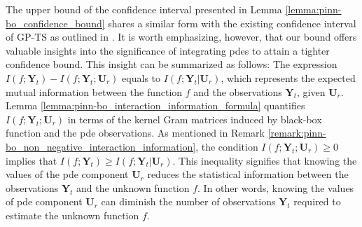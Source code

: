 \begin{remark}
    The upper bound of the confidence interval presented in Lemma \ref{lemma:pinn-bo_confidence_bound} shares a similar form with the existing confidence interval of GP-TS as outlined in \citet{chowdhury2017kernelized}. It is worth emphasizing, however, that our bound offers valuable insights into the significance of integrating \acp{pde} to attain a tighter confidence bound. This insight can be summarized as follows: The expression $I(f; \mathbf{Y}_t) - I(f; \mathbf{Y}_t; \mathbf{U}_r)$ equals to $I(f; \mathbf{Y}_t|\mathbf{U}_r)$, which represents the expected mutual information between the function $f$ and the observations $\mathbf{Y}_t$, given $\mathbf{U}_r$. Lemma \ref{lemma:pinn-bo_interaction_information_formula} quantifies $I(f; \mathbf{Y}_t; \mathbf{U}_r)$ in terms of the kernel Gram matrices induced by black-box function and the \ac{pde} observations. As mentioned in Remark \ref{remark:pinn-bo_non_negative_interaction_information}, the condition $I(f; \mathbf{Y}_t; \mathbf{U}_r) \ge 0$ implies that $I(f; \mathbf{Y}_t) \ge I(f; \mathbf{Y}_t|\mathbf{U}_r)$.  This inequality signifies that knowing the values of the \ac{pde} component $\mathbf{U}_r$ reduces the statistical information between the observations $\mathbf{Y}_t$ and the unknown function $f$. In other words, knowing the values of \ac{pde} component $\mathbf{U}_r$ can diminish the number of observations $\mathbf{Y}_t$ required to estimate the unknown function $f$. 
\end{remark} 

